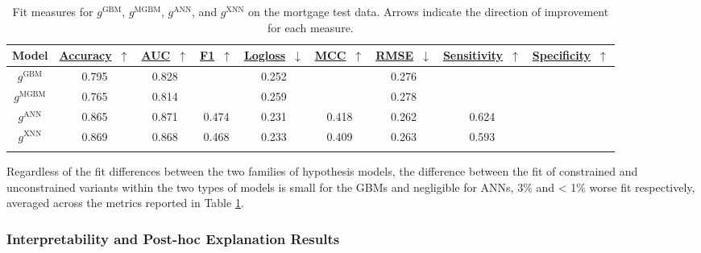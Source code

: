\documentclass[information,article,submit,moreauthors,pdftex]{definitions/mdpi}
\begin{document}
\begin{table}[htb]
	\caption{Fit measures for $g^\text{GBM}$, $g^\text{MGBM}$, $g^\text{ANN}$, and $g^\text{XNN}$ on the mortgage test data. Arrows indicate the direction of improvement for each measure.}
\centering
\begin{tabular}{ccccccccc}
	\toprule
	\textbf{Model} & 
	\href{https://scikit-learn.org/stable/modules/model_evaluation.html#accuracy-score}{\textbf{Accuracy}}~$\uparrow$ & \href{https://en.wikipedia.org/wiki/Receiver_operating_characteristic#Area_under_the_curve}{\textbf{AUC}}~$\uparrow$ & \href{https://en.wikipedia.org/wiki/F1_score}{\textbf{F1}}~$\uparrow$ & 
	\href{https://scikit-learn.org/stable/modules/model_evaluation.html#log-loss}{\textbf{Logloss}}~$\downarrow$ & \href{https://en.wikipedia.org/wiki/Matthews_correlation_coefficient}{\textbf{MCC}}~$\uparrow$ & \href{https://en.wikipedia.org/wiki/Root-mean-square_deviation}{\textbf{RMSE}}~$\downarrow$ & \href{https://en.wikipedia.org/wiki/Sensitivity_and_specificity}{\textbf{Sensitivity}}~$\uparrow$ & \href{https://en.wikipedia.org/wiki/Sensitivity_and_specificity}{\textbf{Specificity}}~$\uparrow$ \\
	\midrule	
$g^\text{GBM}$		& 0.795	& 0.828	& & 0.252 &	& 0.276 & & \\
$g^\text{MGBM}$		& 0.765	& 0.814	& & 0.259 &	& 0.278 & & \\
$g^\text{ANN}$		& 0.865	& 0.871	& 0.474 & 0.231 &	0.418 & 0.262 & 0.624 & \\
$g^\text{XNN}$		& 0.869	& 0.868	& 0.468 & 0.233 &	0.409 & 0.263 & 0.593 & \\
\bottomrule
\label{tab:mort_acc}
\end{tabular}
\end{table}

\noindent Regardless of the fit differences between the two families of hypothesis models, the difference between the fit of constrained and unconstrained variants within the two types of models is small for the GBMs and negligible for ANNs, 3\% and < 1\% worse fit respectively, averaged across the metrics reported in Table \ref{tab:mort_acc}. 


\subsubsection{Interpretability and Post-hoc Explanation Results} 
\end{document}

